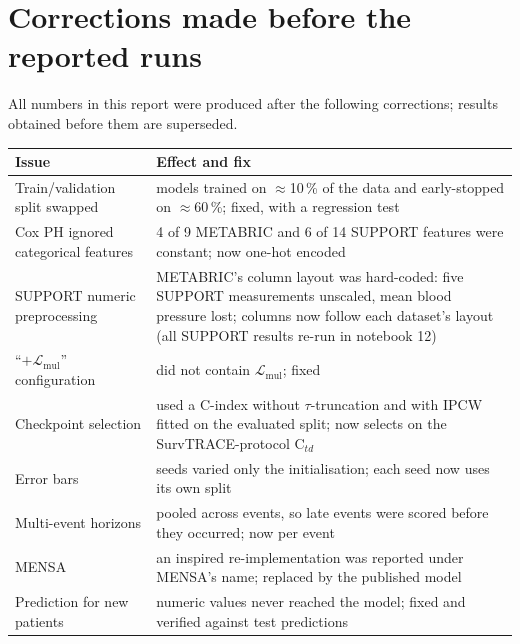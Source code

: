 \documentclass[11pt,a4paper]{article}
\newcommand{\Lmul}{$\mathcal{L}_{\mathrm{mul}}$}
\newcommand{\Ctd}{C$_{td}$}
\begin{document}
\section{Corrections made before the reported runs}\label{app:fixes}
All numbers in this report were produced after the following corrections; results obtained before them are superseded.
\begin{table}[H]\centering\small
\begin{tabular}{p{5.2cm}p{9.8cm}}
\toprule
Issue & Effect and fix \\
\midrule
Train/validation split swapped & models trained on $\approx$10\,\% of the data and early-stopped on $\approx$60\,\%; fixed, with a regression test \\
Cox PH ignored categorical features & 4 of 9 METABRIC and 6 of 14 SUPPORT features were constant; now one-hot encoded \\
SUPPORT numeric preprocessing & METABRIC's column layout was hard-coded: five SUPPORT measurements unscaled, mean blood pressure lost; columns now follow each dataset's layout (all SUPPORT results re-run in notebook 12) \\
``$+$\Lmul{}'' configuration & did not contain \Lmul{}; fixed \\
Checkpoint selection & used a C-index without $\tau$-truncation and with IPCW fitted on the evaluated split; now selects on the SurvTRACE-protocol \Ctd{} \\
Error bars & seeds varied only the initialisation; each seed now uses its own split \\
Multi-event horizons & pooled across events, so late events were scored before they occurred; now per event \\
MENSA & an inspired re-implementation was reported under MENSA's name; replaced by the published model \\
Prediction for new patients & numeric values never reached the model; fixed and verified against test predictions \\
\bottomrule
\end{tabular}
\end{table}

\end{document}
